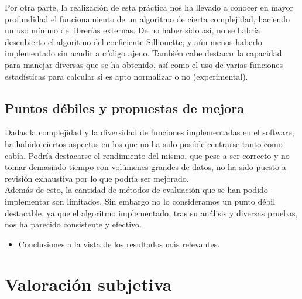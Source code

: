 \documentclass[10pt,a4paper]{article}
\begin{document}
Por otra parte, la realización de esta práctica nos ha llevado a conocer en
mayor profundidad el funcionamiento de un algoritmo de cierta complejidad,
haciendo un uso mínimo de librerías externas. De no haber sido así, no se habría
descubierto el algoritmo del coeficiente Silhouette, y aún menos haberlo
implementado sin acudir a código ajeno. También cabe destacar la capacidad para
manejar diversas que se ha obtenido, así como el uso de varias funciones
estadísticas para calcular si es apto normalizar o no (experimental).

\subsection{Puntos débiles y propuestas de mejora}
Dadas la complejidad y la diversidad de funciones implementadas en el software,
ha habido ciertos aspectos en los que no ha sido posible centrarse tanto como
cabía. Podría destacarse el rendimiento del mismo, que pese a ser correcto y no
tomar demasiado tiempo con volúmenes grandes de datos, no ha sido puesto a
revisión exhaustiva por lo que podría ser mejorado.\\

Además de esto, la cantidad de métodos de evaluación que se han podido
implementar son limitados. Sin embargo no lo consideramos un punto débil
destacable, ya que el algoritmo implementado, tras su análisis y diversas
pruebas, nos ha parecido consistente y efectivo.\\

	\begin{itemize}
	
		\item Conclusiones a la vista de los resultados más relevantes.
		
	\end{itemize}

\section{Valoración subjetiva}
\end{document}
